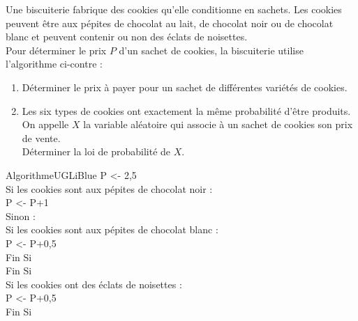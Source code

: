 \documentclass[a4paper,11pt,exos]{nsi} %
\begin{document}
\begin{minipage}{8.4cm}
	\exo{}
	Une biscuiterie fabrique des cookies qu'elle conditionne en sachets. Les cookies peuvent être aux pépites de chocolat au lait, de chocolat noir ou de chocolat blanc et peuvent contenir ou non des éclats de noisettes.\\
	Pour déterminer le prix $P$ d'un sachet de cookies, la biscuiterie utilise l'algorithme ci-contre :
	\begin{enumerate}
		\item 	Déterminer le prix à payer pour un sachet de différentes variétés de cookies.
		\item 	Les six types de cookies ont exactement la même probabilité d'être produits.\\
		On appelle $X$ la variable aléatoire qui associe à un sachet de cookies son prix de vente.\\
		Déterminer la loi de probabilité de $X$.	
	\end{enumerate}
	
\end{minipage}
\hspace{0.5cm}
\begin{minipage}{8.5cm}
    \begin{encadrecolore}{Algorithme}{UGLiBlue}
P <- 2,5\\
Si les cookies sont aux pépites de chocolat noir :\\
\hspace*{1em}  P <- P+1\\
Sinon :\\
\hspace*{1em}   Si les cookies sont aux pépites de chocolat blanc :\\
\hspace*{2em}      P <- P+0,5\\
\hspace*{1em}   Fin Si\\
Fin Si\\
Si les cookies ont des éclats de noisettes :\\
\hspace*{1em}   P <- P+0,5\\
Fin Si
	\end{encadrecolore}
\end{minipage}

\vspace{1cm}
\end{document}
